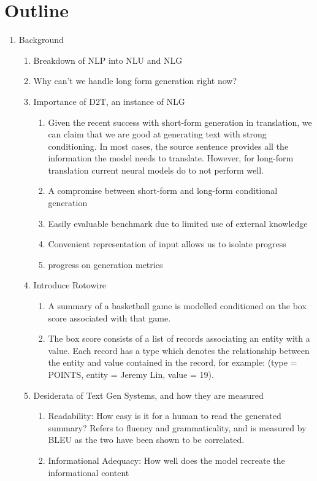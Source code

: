 \documentclass[11pt]{article}
\begin{document}
\section{Outline}
\begin{enumerate}
\item Background
\begin{enumerate}
\item Breakdown of NLP into NLU and NLG
\item Why can't we handle long form generation right now?
\item Importance of D2T, an instance of NLG
\begin{enumerate}
\item Given the recent success with short-form generation in translation,
we can claim that we are good at generating text with strong conditioning.
In most cases, the source sentence provides all the information the model needs to translate.
However, for long-form translation current neural models do to not perform well.
\item A compromise between short-form and long-form conditional generation  
\item Easily evaluable benchmark due to limited use of external knowledge
\item Convenient representation of input allows us to isolate progress
\item 
progress on generation metrics
\end{enumerate}
\item Introduce Rotowire \citep{wiseman2017d2t}
\begin{enumerate}
\item A summary of a basketball game is modelled conditioned on the box score
associated with that game.
\item The box score consists of a list of records associating an entity with a value.
Each record has a type which denotes the relationship between the entity and value
contained in the record,
for example: (type = POINTS, entity = Jeremy Lin, value = 19).
\end{enumerate}
\item Desiderata of Text Gen Systems, and how they are measured
\begin{enumerate}
\item Readability: How easy is it for a human to read the generated summary?
Refers to fluency and grammaticality, and is measured by BLEU as the two have been
shown to be correlated.
\item Informational Adequacy: How well does the model recreate the informational content

\end{enumerate}
\end{enumerate}
\end{enumerate}
\end{document}
